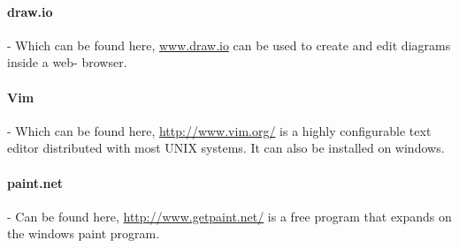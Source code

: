 \documentclass[../document]{subfiles}
\begin{document}
\paragraph{draw.io} - Which can be found here, \url{www.draw.io} can be used to create and edit diagrams inside a web- browser.

\paragraph{Vim} - Which can be found here, \url{http://www.vim.org/} is a highly configurable text editor distributed with most UNIX systems. It can also be installed on windows.

\paragraph{paint.net} - Can be found here, \url{http://www.getpaint.net/} is a free program that expands on the windows paint program. 
\end{document}
